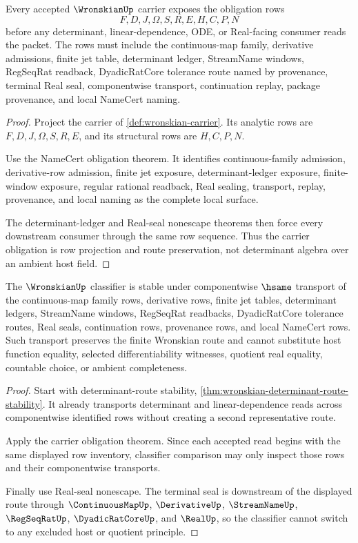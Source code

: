 \begin{theorem}
\label{thm:wronskian-carrier-obligation}
Every accepted $\WronskianUp$ carrier exposes the obligation rows
$$
F,D,J,\Omega,S,R,E,H,C,P,N
$$
before any determinant, linear-dependence, ODE, or Real-facing consumer reads the packet. The rows must include the continuous-map family, derivative admissions, finite jet table, determinant ledger, StreamName windows, RegSeqRat readback, DyadicRatCore tolerance route named by provenance, terminal Real seal, componentwise transport, continuation replay, package provenance, and local NameCert naming.
\end{theorem}
\begin{proof}
Project the carrier of \autoref{def:wronskian-carrier}. Its analytic rows are $F,D,J,\Omega,S,R,E$, and its structural rows are $H,C,P,N$.

Use the NameCert obligation theorem. It identifies continuous-family admission, derivative-row admission, finite jet exposure, determinant-ledger exposure, finite-window exposure, regular rational readback, Real sealing, transport, replay, provenance, and local naming as the complete local surface.

The determinant-ledger and Real-seal nonescape theorems then force every downstream consumer through the same row sequence. Thus the carrier obligation is row projection and route preservation, not determinant algebra over an ambient host field.
\end{proof}

\begin{theorem}
\label{thm:wronskian-classifier-stability}
The $\WronskianUp$ classifier is stable under componentwise $\hsame$ transport of the continuous-map family rows, derivative rows, finite jet tables, determinant ledgers, StreamName windows, RegSeqRat readbacks, DyadicRatCore tolerance routes, Real seals, continuation rows, provenance rows, and local NameCert rows. Such transport preserves the finite Wronskian route and cannot substitute host function equality, selected differentiability witnesses, quotient real equality, countable choice, or ambient completeness.
\end{theorem}
\begin{proof}
Start with determinant-route stability, \autoref{thm:wronskian-determinant-route-stability}. It already transports determinant and linear-dependence reads across componentwise identified rows without creating a second representative route.

Apply the carrier obligation theorem. Since each accepted read begins with the same displayed row inventory, classifier comparison may only inspect those rows and their componentwise transports.

Finally use Real-seal nonescape. The terminal seal is downstream of the displayed route through $\ContinuousMapUp$, $\DerivativeUp$, $\StreamNameUp$, $\RegSeqRatUp$, $\DyadicRatCoreUp$, and $\RealUp$, so the classifier cannot switch to any excluded host or quotient principle.
\end{proof}

